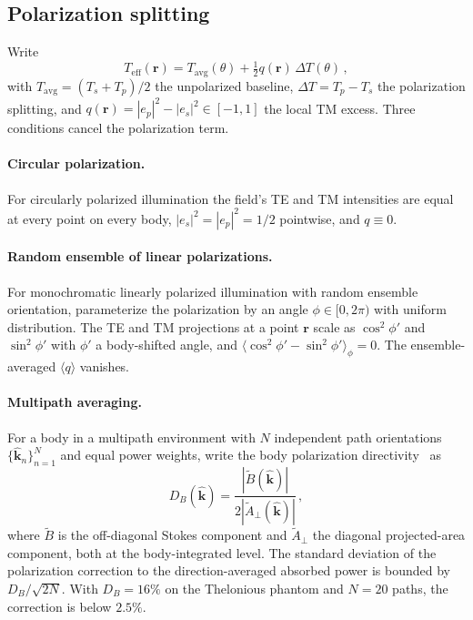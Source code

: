 \documentclass[journal,twocolumn,10pt]{IEEEtran}
\theoremstyle{plain}
\theoremstyle{remark}
\newcommand{\khat}{\hat{\bm{k}}}
\newcommand{\rr}{\mathbf{r}}
\newcommand{\Teff}{T_{\mathrm{eff}}}
\newcommand{\Tavg}{T_{\mathrm{avg}}}
\begin{document}
\subsection{Polarization splitting}
Write
\begin{equation}\label{eq:Teff-decomp-SI}
  \Teff(\rr) = \Tavg(\theta) + \tfrac{1}{2}q(\rr)\,\Delta T(\theta)\, ,
\end{equation}
with $\Tavg = (T_s + T_p)/2$ the unpolarized baseline,
$\Delta T = T_p - T_s$ the polarization splitting, and
$q(\rr) = |e_p|^2 - |e_s|^2 \in [-1,1]$ the local TM excess. Three
conditions cancel the polarization term.

\paragraph{Circular polarization.} For circularly polarized
illumination the field's TE and TM intensities are equal at every
point on every body, $|e_s|^2 = |e_p|^2 = 1/2$ pointwise, and
$q \equiv 0$.

\paragraph{Random ensemble of linear polarizations.} For
monochromatic linearly polarized illumination with random ensemble
orientation, parameterize the polarization by an angle
$\phi \in [0, 2\pi)$ with uniform distribution. The TE and TM
projections at a point $\rr$ scale as $\cos^2\phi'$ and $\sin^2\phi'$
with $\phi'$ a body-shifted angle, and $\langle\cos^2\phi' -
\sin^2\phi'\rangle_\phi = 0$. The ensemble-averaged $\langle q \rangle$
vanishes.

\paragraph{Multipath averaging.} For a body in a multipath
environment with $N$ independent path orientations
$\{\khat_n\}_{n=1}^N$ and equal power weights, write the body
polarization directivity~\cite{Diao2024} as
\begin{equation}\label{eq:DB}
  D_B(\khat) = \frac{|\tilde{B}(\khat)|}{2|\tilde{A}_\perp(\khat)|}\, ,
\end{equation}
where $\tilde{B}$ is the off-diagonal Stokes component and
$\tilde{A}_\perp$ the diagonal projected-area component, both at the
body-integrated level. The standard deviation of the polarization correction
to the direction-averaged absorbed power is bounded by
$D_B / \sqrt{2N}$. With $D_B = 16\%$ on the Thelonious phantom and
$N = 20$ paths, the correction is below $2.5\%$.
\end{document}
